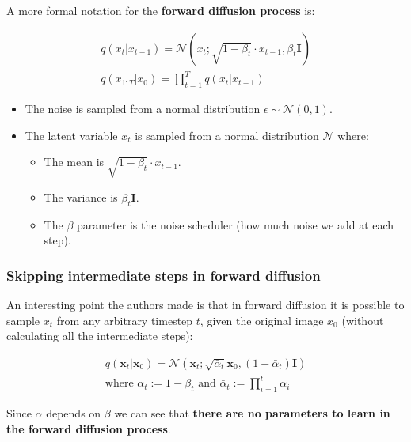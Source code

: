 A more formal notation for the \textbf{forward diffusion process} is:

\begin{equation*}
    \begin{aligned}
        q(x_t | x_{t-1}) = \mathcal{N}(x_t; \sqrt{1-\beta_t} \cdot x_{t-1}, \beta_t \mathbf{I}) \\
        q(x_{1:T} | x_0) = \prod_{t=1}^{T} q(x_t | x_{t-1})
    \end{aligned}
\end{equation*}

\begin{itemize}
    \item The noise is sampled from a normal distribution $\epsilon \sim \mathcal{N}(0, 1)$.
    \item The latent variable $x_t$ is sampled from a normal distribution $\mathcal{N}$ where:
    \begin{itemize}
        \item The mean is $\sqrt{1-\beta_t} \cdot x_{t-1}$.
        \item The variance is $\beta_t \mathbf{I}$.
        \item The $\beta$ parameter is the noise scheduler (how much noise we add at each step).
    \end{itemize}
\end{itemize}



\subsubsection*{Skipping intermediate steps in forward diffusion}


An interesting point the authors made is that in forward diffusion it is possible to sample $x_t$ from any arbitrary timestep $t$, given the original image $x_0$ (without calculating all the intermediate steps):

\begin{equation}
    \begin{aligned}
    q(\mathbf{x}_t|\mathbf{x}_0) = \mathcal{N}(\mathbf{x}_t; \sqrt{\bar{\alpha}_t}\mathbf{x}_0, (1 - \bar{\alpha}_t)\mathbf{I}) \\
    \text{where } \alpha_t := 1 - \beta_t \text{ and } \bar{\alpha}_t := \prod_{i=1}^{t} \alpha_i
    \end{aligned}
    \label{eq:forward_diffusion}
\end{equation}

Since $\alpha$ depends on $\beta$ we can see that \textbf{there are no parameters to learn in the forward diffusion process}.

